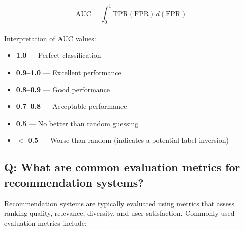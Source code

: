 \documentclass[11pt]{article}
\begin{document}
\[
	\text{AUC} = \int_{0}^{1} \text{TPR}(\text{FPR}) \, d(\text{FPR})
\]
\\
Interpretation of AUC values:
\begin{itemize}
	\item \textbf{1.0} — Perfect classification
	\item \textbf{0.9–1.0} — Excellent performance
	\item \textbf{0.8–0.9} — Good performance
	\item \textbf{0.7–0.8} — Acceptable performance
	\item \textbf{0.5} — No better than random guessing
	\item \textbf{$<$ 0.5} — Worse than random (indicates a potential label inversion)
\end{itemize}

\subsection*{Q: What are common evaluation metrics for recommendation systems?}
Recommendation systems are typically evaluated using metrics that assess ranking quality, relevance, diversity, and user satisfaction. Commonly used evaluation metrics include:
\end{document}
